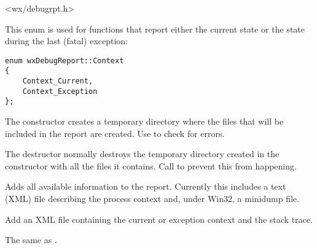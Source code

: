 <wx/debugrpt.h>




This enum is used for functions that report either the current state
or the state during the last (fatal) exception:

\begin{verbatim}
enum wxDebugReport::Context
{
    Context_Current,
    Context_Exception
};
\end{verbatim}



\label{wxdebugreportwxdebugreport}


The constructor creates a temporary directory where the files that will
be included in the report are created. Use 
 to check for errors.


\label{wxdebugreportdtor}


The destructor normally destroys the temporary directory created in the constructor
with all the files it contains. Call  to
prevent this from happening.


\label{wxdebugreportaddall}


Adds all available information to the report. Currently this includes a
text (XML) file describing the process context and, under Win32, a minidump
file.


\label{wxdebugreportaddcontext}


Add an XML file containing the current or exception context and the
stack trace.


\label{wxdebugreportaddcurrentcontext}


The same as .


